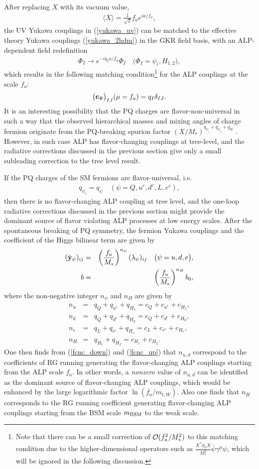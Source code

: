 \documentclass[preprint,prd,aps,tighten,nofootinbib,amssymb]{revtex4}
\newcommand{\bea}{\begin{eqnarray}}
\newcommand{\eea}{\end{eqnarray}}
\def\vpq{f_{a}}
\newcommand{\C}{\bold c}
\newcommand{\Y}{\tilde{\bold  y}}
\begin{document}
After replacing $X$ with its vacuum value,
\bea
\langle X\rangle = \frac{1}{\sqrt{2}} f_a e^{ia/f_a},
\eea
the UV Yukawa couplings in (\ref{yukawa_uv}) can be matched to the effective theory Yukawa couplings (\ref{yukawa_2hdm}) in the GKR field basis, with an ALP-dependent field redefinition
\bea
\Phi_I \rightarrow e^{-iq_I a/\vpq} \Phi_I \quad \big(\Phi_I=\psi_i, H_{1,2}\big),
\eea
which results in the following matching condition\footnote{Note that there can be a small correction of ${\cal O}(\vpq^2/M_*^2)$ to this matching condition due to the higher-dimensional operators such as $\frac{X^*\partial_\mu X}{M_*^2}\bar\psi\gamma^\mu\psi$, which will be ignored in the following discussion.} for the ALP couplings at the scale $f_a$:
\bea \label{matching_1}
\big(\C_\Phi\big)_{IJ} (\mu=\vpq) = q_I\delta_{IJ}.
\eea
It is an interesting possibility that the PQ charges are flavor-non-universal in such a way that the observed hierarchical masses and mixing angles of charge fermion originate from the PQ-breaking spurion factor $(X/M_*)^{q_{\psi_i}+q_{\psi_j}+q_H}$ \cite{Ema:2016ops, Calibbi:2016hwq}.  
However, in such case ALP has flavor-changing couplings at tree-level, and the radiative corrections discussed in the previous section give only a small subleading correction to the tree level result.

If the PQ charges of the SM fermions are flavor-universal, i.e.
\bea
q_{\psi_i}=q_\psi \quad (\psi=Q,u^c,d^c,L,e^c),
\label{eq:FlavorUniversalCoupling}
\eea
then there is no flavor-changing ALP coupling at tree level, and the one-loop radiative corrections discussed in the previous section might provide the dominant source of  flavor violating ALP processes at low energy scales.
After the spontaneous breaking of PQ symmetry, the fermion Yukawa couplings  and the coefficient of the Higgs bilinear term are given by 
\bea
(\Y_\psi)_{ij} &=& \left(\frac{\vpq}{M_*}\right)^{n_\psi}(\lambda_\psi)_{ij}  \quad \big(\psi=u,d,e\big), \\
\label{eq:SpurionYukawa}
{b} &=& \left(\frac{\vpq}{M_*}\right)^{n_H} b_0,
\eea
where the non-negative integer $n_\psi$ and $n_H$ are given by
\bea \label{n_s}
n_u&=& q_{Q}+q_{u^c}+q_{H_2}= c_{Q} + c_{u^c} +c_{H_2}, \nonumber \\
n_d&=& q_{Q}+q_{d^c}+q_{H_d}= c_{Q} + c_{d^c} +c_{H_d},\nonumber \\
n_e&=& q_{L}+q_{e^c}+q_{H_e}= c_{L} + c_{e^c} +c_{H_e},\nonumber \\
n_H&=& q_{H_1} + q_{H_2} = c_{H_1} + c_{H_2}.
\eea
One then  finds from (\ref{fcnc_down}) and (\ref{fcnc_up}) that $n_{u,d}$  correspond to the coefficients of RG running   generating the flavor-changing ALP couplings starting from the ALP scale $\vpq$.
In other words,  a {\it nonzero} value of $n_{u,d}$  can be identified as the dominant source of flavor-changing ALP couplings, which would be enhanced by the large logarithmic factor $\ln (\vpq/m_{t,W})$.
Also one finds that $n_H$ corresponds to the RG running coefficient generating flavor-changing ALP couplings starting from the BSM scale $m_{\rm BSM}$  to the weak scale.
\end{document}
